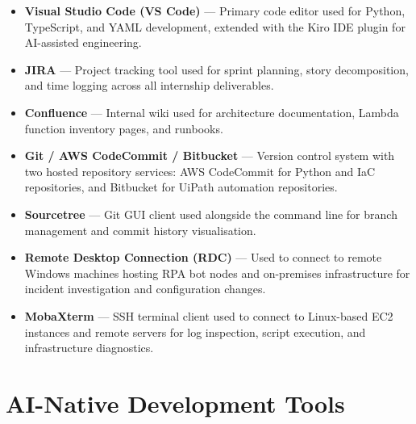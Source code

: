 \begin{itemize}
    \item \textbf{Visual Studio Code (VS Code)} --- Primary code editor
          used for Python, TypeScript, and YAML development, extended
          with the Kiro IDE plugin for AI-assisted engineering.

    \item \textbf{JIRA} --- Project tracking tool used for sprint
          planning, story decomposition, and time logging across all
          internship deliverables.

    \item \textbf{Confluence} --- Internal wiki used for architecture
          documentation, Lambda function inventory pages, and runbooks.

    \item \textbf{Git / AWS CodeCommit / Bitbucket} --- Version control
          system with two hosted repository services: AWS CodeCommit
          for Python and IaC repositories, and Bitbucket for UiPath
          automation repositories.

    \item \textbf{Sourcetree} --- Git GUI client used alongside the
          command line for branch management and commit history
          visualisation.

    \item \textbf{Remote Desktop Connection (RDC)} --- Used to connect
          to remote Windows machines hosting RPA bot nodes and
          on-premises infrastructure for incident investigation and
          configuration changes.

    \item \textbf{MobaXterm} --- SSH terminal client used to connect
          to Linux-based EC2 instances and remote servers for log
          inspection, script execution, and infrastructure diagnostics.

\end{itemize}

\section{AI-Native Development Tools}
\label{sec:tools_ai}

